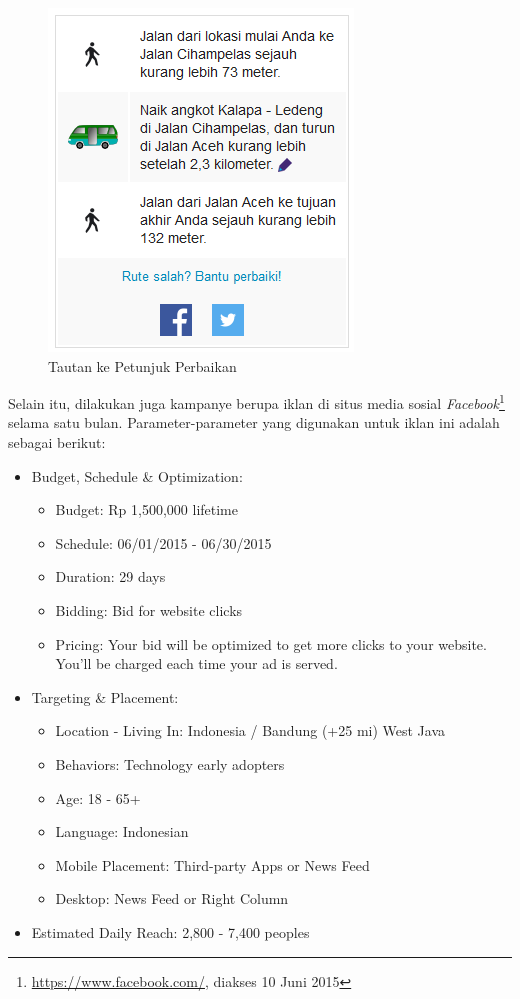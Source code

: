 \begin{figure}
	\centering
	\includegraphics[scale=0.75]{Gambar/5_petunjuk}
	\caption{Tautan ke Petunjuk Perbaikan} 
	\label{fig:5_petunjuk}
\end{figure}

Selain itu, dilakukan juga kampanye berupa iklan di situs media sosial \textit{Facebook}\footnote{\url{https://www.facebook.com/}, diakses 10 Juni 2015} selama satu bulan. Parameter-parameter yang digunakan untuk iklan ini adalah sebagai berikut:

\begin{itemize}
	\item Budget, Schedule \& Optimization:
	\begin{itemize}
		\item Budget: Rp 1,500,000 lifetime
		\item Schedule: 06/01/2015 - 06/30/2015
		\item Duration: 29 days
		\item Bidding: Bid for website clicks
		\item Pricing: Your bid will be optimized to get more clicks to your website. You'll be charged each time your ad is served.
	\end{itemize}
	\item Targeting \& Placement:
	\begin{itemize}
		\item Location - Living In: Indonesia / Bandung (+25 mi) West Java
		\item Behaviors: Technology early adopters
		\item Age: 18 - 65+
		\item Language: Indonesian
		\item Mobile Placement: Third-party Apps or News Feed
		\item Desktop: News Feed or Right Column
	\end{itemize}
	\item Estimated Daily Reach: 2,800 - 7,400 peoples
\end{itemize}

